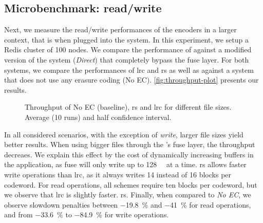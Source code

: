 \begin{table}
    \centering
    \caption{Encoding throughput of the different encoders in \si{\mega\byte\per\second}}
    
    \label{table:codes-performance-table}
\end{table}

\subsection{Microbenchmark: read/write}
Next, we measure the read/write performances of the encoders in a larger context, that is when plugged into the \SYS system.
In this experiment, we setup a Redis cluster of 100 nodes.
We compare the performance of \SYS against a modified version of the system (\textit{Direct}) that completely bypass the \ac{fuse} layer.
For both systems, we compare the performances of \ac{lrc} and \ac{rs} as well as against a system that does not use any erasure coding (No EC).  
\autoref{fig:throughput-plot} presents our results.
\begin{figure*}[t]
    \centering
    
    \caption{Throughput of No EC (baseline), \ac{rs} and \ac{lrc} for different file sizes. Average (10 runs) and half confidence interval.}
    \label{fig:throughput-plot}
\end{figure*}
In all considered scenarios, with the exception of \SYS \textit{write}, larger file sizes yield better results.
When using bigger files through the \SYS's \ac{fuse} layer, the throughput decreaes.
We explain this effect by the cost of dynamically increasing buffers in the application, as \ac{fuse} will only write up to \SI{128}{\kibi\byte} at a time.
\ac{rs} allows faster write operations than \ac{lrc}, as it always writes 14 instead of 16 blocks per codeword.
For read operations, all schemes require ten blocks per codeword, but we observe that \ac{lrc} is slightly faster. \ac{rs}. 
Finally, when compared to \textit{No EC}, we observe slowdown penalties between \SI{-19.8}{\percent} and \SI{-41}{\percent} for read operations, and from \SI{-33.6}{\percent} to \SI{-84.9}{\percent} for write operations.


